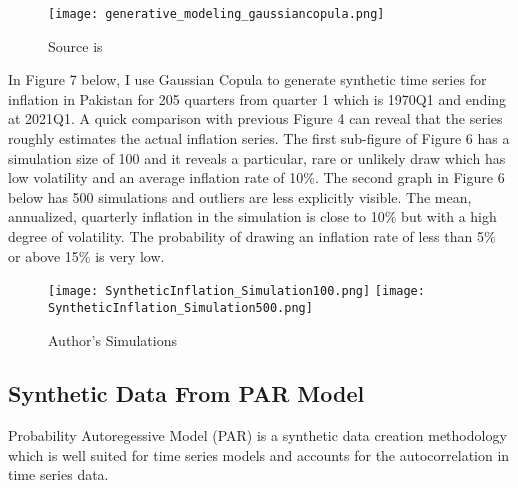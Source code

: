 \documentclass[12pt]{article}
\newcommand{\1}{\mathbbm 1}
\begin{document}
		
		
		
		
		
		
		
		
		
		
		
		
		
		
		
		
		\begin{figure}[H]
			\begin{Center}
				\texttt{[image: generative\_modeling\_gaussiancopula.png]}
				\caption{Source is  \cite{patki2016synthetic}}
			\end{Center}
		\end{figure}
		
		
		
		In Figure 7 below, I use Gaussian Copula to generate synthetic time series for inflation in Pakistan for 205 quarters from quarter 1 which is 1970Q1 and ending at 2021Q1. A quick comparison with previous Figure 4 can reveal that the series roughly estimates the actual inflation series. The first sub-figure of Figure 6 has a simulation size of 100 and it reveals a particular, rare or unlikely draw which has low volatility and an average inflation rate of 10\%. The second graph in Figure 6 below has 500 simulations and outliers are less explicitly visible. The mean, annualized, quarterly inflation in the simulation is close to 10\% but with a high degree of volatility. The probability of drawing an inflation rate of less than 5\% or above 15\% is very low.
		
		
		
		
		
		
		
		\begin{figure}[H]
			\begin{Center}
				\texttt{[image: SyntheticInflation\_Simulation100.png]}
				\texttt{[image: SyntheticInflation\_Simulation500.png]}
				\caption{Author's Simulations}
			\end{Center}
		\end{figure}
		
		\subsection{Synthetic Data From PAR Model}
		
		Probability Autoregessive Model (PAR) is a synthetic data creation methodology which is well suited for time series models and accounts for the autocorrelation in time series data.
		
\end{document}
